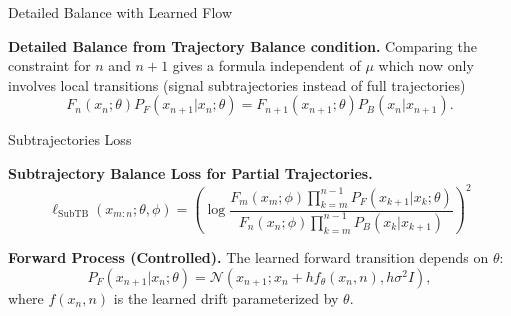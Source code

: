 \documentclass[aspectratio=169,xcolor=dvipsnames]{beamer}
\begin{document}
\begin{frame}[t]{Detailed Balance with Learned Flow}
\footnotesize

\textbf{Detailed Balance from Trajectory Balance condition.} Comparing the constraint for $n$ and $n+1$ gives a formula independent of $\mu$ which now only involves local transitions (signal subtrajectories instead of full trajectories)
\[
F_n(x_n; \theta) P_F(x_{n+1} | x_n; \theta) = F_{n+1}(x_{n+1}; \theta) P_B(x_n | x_{n+1}).
\]

\end{frame}

\begin{frame}[t]{Subtrajectories Loss}
\footnotesize

\textbf{Subtrajectory Balance Loss for Partial Trajectories.}
\[
\ell_{\text{SubTB}}(x_{m:n}; \theta, \phi) = \left( \log \frac{F_m(x_m; \phi) \prod_{k=m}^{n-1} P_F(x_{k+1} | x_k; \theta)}{F_n(x_n; \phi) \prod_{k=m}^{n-1} P_B(x_k | x_{k+1})} \right)^2
\]

\textbf{Forward Process (Controlled).} The learned forward transition depends on \(\theta\):
\[
P_F(x_{n+1} | x_n; \theta) = \mathcal{N}\left( x_{n+1}; x_n + h f_\theta(x_n, n), h \sigma^2 I \right),
\]
where \(f(x_n, n)\) is the learned drift parameterized by \(\theta\).


\end{frame}
\end{document}
